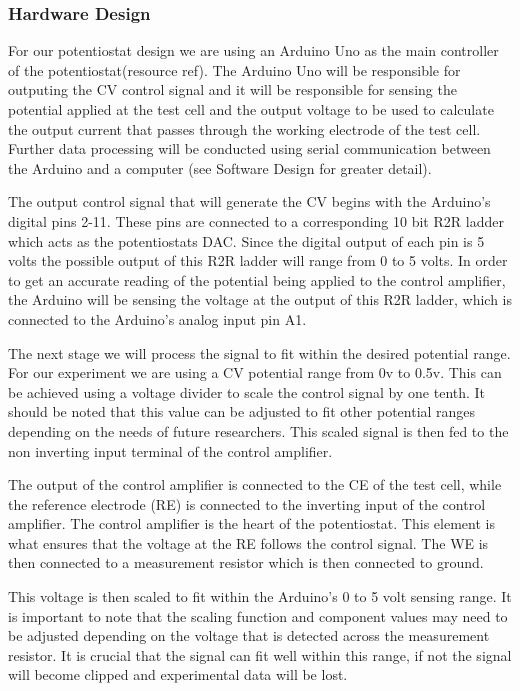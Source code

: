 \documentclass{article}
\begin{document}
\subsubsection*{Hardware Design}
For our potentiostat design we are using an Arduino Uno as the main controller of the potentiostat(resource ref). The Arduino Uno will be responsible for outputing the CV control signal and it will be responsible for sensing the potential applied at the test cell and the output voltage to be used to calculate the output current that passes through the working electrode of the test cell. Further data processing will be conducted using serial communication between the Arduino and a computer (see Software Design for greater detail).

The output control signal that will generate the CV begins with the Arduino's digital pins 2-11. These pins are connected to a corresponding 10 bit R2R ladder which acts as the potentiostats DAC. Since the digital output of each pin is 5 volts the possible output of this R2R ladder will range from 0 to 5 volts. In order to get an accurate reading of the potential being applied to the control amplifier, the Arduino will be sensing the voltage at the output of this R2R ladder, which is connected to the Arduino's analog input pin A1.

The next stage we will process the signal to fit within the desired potential range. For our experiment we are using a CV potential range from 0v to 0.5v. This can be achieved using a voltage divider to scale the control signal by one tenth. It should be noted that this value can be adjusted to fit other potential ranges depending on the needs of future researchers. This scaled signal is then fed to the non inverting input terminal of the control amplifier. 

The output of the control amplifier is connected to the CE of the test cell, while the reference electrode (RE) is connected to the inverting input of the control amplifier. The control amplifier is the heart of the potentiostat. This element is what ensures that the voltage at the RE follows the control signal. The WE is then connected to a measurement resistor which is then connected to ground. 

This voltage is then scaled to fit within the Arduino's 0 to 5 volt sensing range. It is important to note that the scaling function and component values may need to be adjusted depending on the voltage that is detected across the measurement resistor. It is crucial that the signal can fit well within this range, if not the signal will become clipped and experimental data will be lost.
\end{document}
